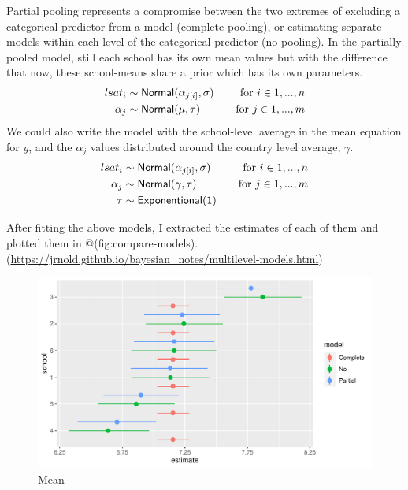\documentclass[a4, 12pt]{article}
\begin{document}
Partial pooling represents a compromise between the two extremes of excluding a categorical predictor from a model (complete pooling), or estimating separate models within each level of the categorical predictor (no pooling). In the partially pooled model, still each school has its own mean values but with the difference that now, these school-means share a prior which has its own parameters.
\begin{align*}
lsat_i & \sim {\sf Normal} (\alpha_{j[i]}, \sigma) & \quad \text{for } i \in 1,...,n \\
\alpha_{j} & \sim {\sf Normal} (\mu, \tau) & \quad \text{for } j \in 1,...,m
\end{align*}
We could also write the model with the school-level average in the mean equation for \(y\), and the \(\alpha_j\) values distributed around the country level average, \(\gamma\).
\begin{align*}
lsat_i & \sim {\sf Normal} (\alpha_{j[i]}, \sigma) & \quad \text{for } i \in 1,...,n \\
\alpha_{j} & \sim {\sf Normal} (\gamma, \tau) & \quad \text{for } j \in 1,...,m \\
\tau & \sim {\sf Exponentional(1)}
\end{align*}

After fitting the above models, I extracted the estimates of each of them and plotted them in @(fig:compare-models). (\url{https://jrnold.github.io/bayesian_notes/multilevel-models.html})

\begin{figure}

{\centering \includegraphics[width=0.8\linewidth]{../figures/compare_models} 

}

\caption{Mean}\label{fig:compare-models}
\end{figure}
\end{document}

